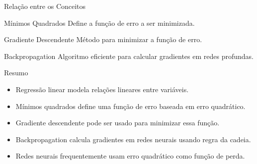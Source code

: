\documentclass{beamer}
\begin{document}

\begin{frame}{Relação entre os Conceitos}
    
    \begin{block}{Mínimos Quadrados}
        Define a função de erro a ser minimizada.
    \end{block}
    
    \begin{block}{Gradiente Descendente}
        Método para minimizar a função de erro.
    \end{block}
    
    \begin{block}{Backpropagation}
        Algoritmo eficiente para calcular gradientes em redes profundas.
    \end{block}
    
\end{frame}


\begin{frame}{Resumo}
    
    \begin{itemize}
        \item Regressão linear modela relações lineares entre variáveis.
        \item Mínimos quadrados define uma função de erro baseada em erro quadrático.
        \item Gradiente descendente pode ser usado para minimizar essa função.
        \item Backpropagation calcula gradientes em redes neurais usando regra da cadeia.
        \item Redes neurais frequentemente usam erro quadrático como função de perda.
    \end{itemize}
    
\end{frame}
\end{document}

